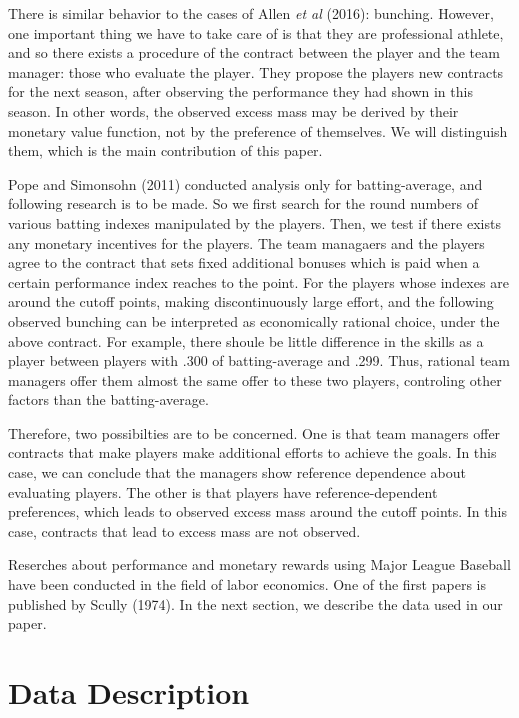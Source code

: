 \documentclass[dvipdfmx, 12pt]{article}
\begin{document}
There is similar behavior to the cases of  Allen \textit{et al} (2016): bunching. However, one important thing we have to take care of is that they are professional athlete, and so there exists a procedure of the contract between the player and the team manager: those who evaluate the player. They propose the players new contracts for the next season, after observing the performance they had shown in this season. In other words, the observed excess mass may be derived by their monetary value function, not by the preference of themselves. We will distinguish them, which is the main contribution of this paper.

Pope and Simonsohn (2011) conducted analysis only for batting-average, and following research is to be made. So we first search for the round numbers of various batting indexes manipulated by the players. Then, we test if there exists any monetary incentives for the players. The team managaers and the players agree to the contract that sets fixed additional bonuses which is paid when a certain performance index reaches to the point. For the players whose indexes are around the cutoff points, making discontinuously large effort, and the following observed bunching can be interpreted as economically rational choice, under the above contract. For example, there shoule be little difference in the skills as a player between players with .300 of batting-average and .299. Thus, rational team managers offer them almost the same offer to these two players, controling other factors than the batting-average.

Therefore, two possibilties are to be concerned. One is that team managers offer contracts that make players make additional efforts to achieve the goals. In this case, we can conclude that the managers show reference dependence about evaluating players. The other is that players have reference-dependent preferences, which leads to observed excess mass around the cutoff points. In this case, contracts that lead to excess mass are not observed.

Reserches about performance and monetary rewards using Major League Baseball have been conducted in the field of labor economics. One of the first papers is published by Scully (1974). In the next section, we describe the data used in our paper.

\section{Data Description}
\end{document}
